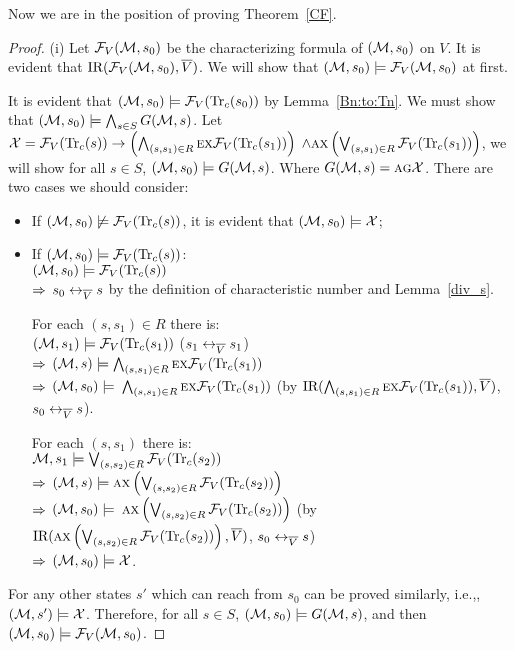 \documentclass{article}
\begin{document}
 Now we are in the position of proving Theorem~\ref{CF}.\\
 \begin{proof}
 (i) Let ${\cal F}_V({\cal M}, s_0)$ be the characterizing formula of $({\cal M}, s_0)$ on $V$.
 It is evident that $\textrm{IR}({\cal F}_V({\cal M}, s_0), \overline V)$. We will show that $({\cal M}, s_0) \models {\cal F}_V({\cal M}, s_0)$ at first.

 It is evident that $({\cal M}, s_0) \models {\cal F}_V(\textrm{Tr}_c(s_0))$ by Lemma~\ref{Bn:to:Tn}.
 We must show that $({\cal M}, s_0) \models \bigwedge_{s\in S} G({\cal M}, s)$.
 Let ${\cal X} = {\cal F}_V(\textrm{Tr}_c(s)) \rightarrow \left(\bigwedge_{(s,s_1) \in R} \textsc{e} \textsc{x} {\cal F}_V(\textrm{Tr}_c(s_1))\right)$ $\wedge \textsc{a} \textsc{x} \left(\bigvee_{(s,s_1) \in R} {\cal F}_V(\textrm{Tr}_c(s_1))\right)$, we will show for all $s\in S$, $({\cal M}, s_0) \models G({\cal M}, s)$. Where $G({\cal M}, s)=\textsc{a}\textsc{g} \cal X$.
 There are two cases we should consider:
 \begin{itemize}
   \item  If $({\cal M}, s_0) \not \models {\cal F}_V(\textrm{Tr}_c(s))$, it is evident that $({\cal M}, s_0) \models {\cal X}$;
   \item  If $({\cal M}, s_0) \models {\cal F}_V(\textrm{Tr}_c(s))$:\\
          $({\cal M}, s_0) \models {\cal F}_V(\textrm{Tr}_c(s))$\\
         $\Rightarrow$  $s_0 \leftrightarrow_{\overline V} s$ by the definition of characteristic number and Lemma~\ref{div_s}.

         For each $(s, s_1)\in R$ there is:\\
          $({\cal M}, s_1) \models {\cal F}_V(\textrm{Tr}_c(s_1))$  \hfill  ($s_1 \leftrightarrow_{\overline V} s_1$)\\
         $\Rightarrow$ $({\cal M}, s) \models \bigwedge_{(s,s_1)\in R}\textsc{e} \textsc{x} {\cal F}_V(\textrm{Tr}_c(s_1))$\\
         $\Rightarrow$ $({\cal M}, s_0) \models$ $\bigwedge_{(s,s_1)\in R}\textsc{e} \textsc{x} {\cal F}_V(\textrm{Tr}_c(s_1))$    \qquad  (by $\textrm{IR}(\bigwedge_{(s,s_1)\in R}\textsc{e} \textsc{x} {\cal F}_V(\textrm{Tr}_c(s_1)), \overline V)$, $s_0 \leftrightarrow_{\overline V} s$).

          For each $(s, s_1)$ there is:\\
           ${\cal M}, s_1 \models \bigvee_{(s, s_2)\in R}{\cal F}_V(\textrm{Tr}_c(s_2))$\\
         $\Rightarrow$ $({\cal M}, s) \models \textsc{a} \textsc{x} \left( \bigvee_{(s, s_2)\in R} {\cal F}_V(\textrm{Tr}_c(s_2)) \right)$ \\
         $\Rightarrow$ $({\cal M}, s_0) \models$  $\textsc{a} \textsc{x} \left( \bigvee_{(s, s_2)\in R} {\cal F}_V(\textrm{Tr}_c(s_2)) \right)$   \qquad  (by $\textrm{IR}(\textsc{a} \textsc{x} \left( \bigvee_{(s, s_2)\in R} {\cal F}_V(\textrm{Tr}_c(s_2)) \right), \overline V)$, $s_0 \leftrightarrow_{\overline V} s$)\\
         $\Rightarrow$ $({\cal M}, s_0) \models {\cal X}$.\\
 \end{itemize}
 For any other states $s'$ which can reach from $s_0$ can be proved similarly, i.e.,, $({\cal M},s')\models \cal X$.
 Therefore, for all $s\in S$, $({\cal M}, s_0) \models G({\cal M}, s)$, and then $({\cal M}, s_0) \models {\cal F}_V({\cal M}, s_0)$.



\end{proof}
\end{document}
